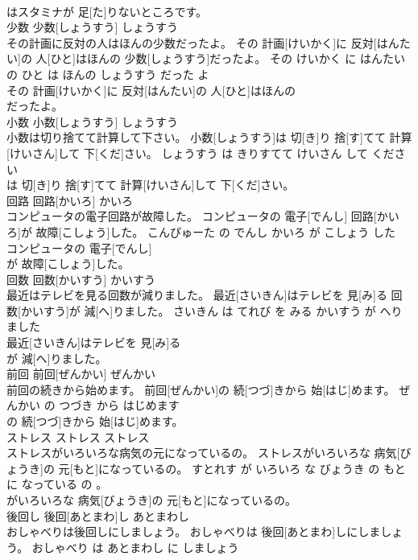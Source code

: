 \documentclass[8pt]{extreport}
\begin{document}
\begin{CJK}{UTF8}{min}
\\	はスタミナが 足[た]りないところです。			
\\	少数	少数[しょうすう]	しょうすう	
\\	その計画に反対の人はほんの少数だったよ。	その 計画[けいかく]に 反対[はんたい]の 人[ひと]はほんの 少数[しょうすう]だったよ。	その けいかく に はんたい の ひと は ほんの しょうすう だった よ	
\\	その 計画[けいかく]に 反対[はんたい]の 人[ひと]はほんの
\\	だったよ。			
\\	小数	小数[しょうすう]	しょうすう	
\\	小数は切り捨てて計算して下さい。	小数[しょうすう]は 切[き]り 捨[す]てて 計算[けいさん]して 下[くだ]さい。	しょうすう は きりすてて けいさん して ください	
\\	は 切[き]り 捨[す]てて 計算[けいさん]して 下[くだ]さい。			
\\	回路	回路[かいろ]	かいろ	
\\	コンピュータの電子回路が故障した。	コンピュータの 電子[でんし] 回路[かいろ]が 故障[こしょう]した。	こんぴゅーた の でんし かいろ が こしょう した	
\\	コンピュータの 電子[でんし]
\\	が 故障[こしょう]した。			
\\	回数	回数[かいすう]	かいすう	
\\	最近はテレビを見る回数が減りました。	最近[さいきん]はテレビを 見[み]る 回数[かいすう]が 減[へ]りました。	さいきん は てれび を みる かいすう が へりました	
\\	最近[さいきん]はテレビを 見[み]る
\\	が 減[へ]りました。			
\\	前回	前回[ぜんかい]	ぜんかい	
\\	前回の続きから始めます。	前回[ぜんかい]の 続[つづ]きから 始[はじ]めます。	ぜんかい の つづき から はじめます	
\\	の 続[つづ]きから 始[はじ]めます。			
\\	ストレス	ストレス	ストレス	
\\	ストレスがいろいろな病気の元になっているの。	ストレスがいろいろな 病気[びょうき]の 元[もと]になっているの。	すとれす が いろいろ な びょうき の もと に なっている の 。	
\\	がいろいろな 病気[びょうき]の 元[もと]になっているの。			
\\	後回し	後回[あとまわ]し	あとまわし	
\\	おしゃべりは後回しにしましょう。	おしゃべりは 後回[あとまわ]しにしましょう。	おしゃべり は あとまわし に しましょう	

\end{CJK}
\end{document}

